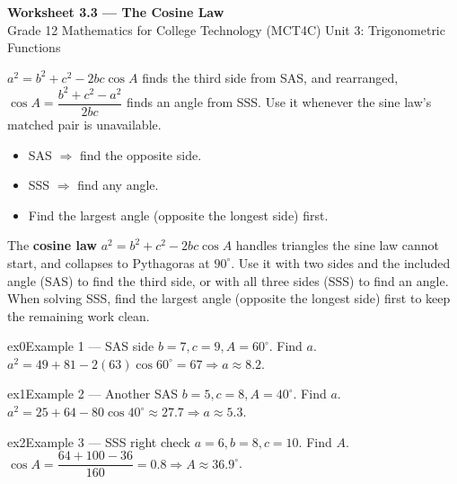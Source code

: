 \documentclass[11pt]{article}
\begin{document}
\begin{center}
{\LARGE\bfseries\color{titleblue}Worksheet 3.3 --- The Cosine Law}\\[2pt]
{\small Grade 12 Mathematics for College Technology (MCT4C) \textperiodcentered{} Unit 3: Trigonometric Functions}
\end{center}

\begin{ideabox}
$a^2=b^2+c^2-2bc\cos A$ finds the third side from SAS, and rearranged, $\cos A=\dfrac{b^2+c^2-a^2}{2bc}$ finds an angle from SSS. Use it whenever the sine law's matched pair is unavailable.
\begin{itemize}[leftmargin=*,itemsep=2pt]
  \item SAS $\Rightarrow$ find the opposite side.
  \item SSS $\Rightarrow$ find any angle.
  \item Find the largest angle (opposite the longest side) first.
\end{itemize}
\end{ideabox}

\begin{learnbox}
The \textbf{cosine law} $a^2=b^2+c^2-2bc\cos A$ handles triangles the sine law cannot start, and collapses to Pythagoras at $90^\circ$.
Use it with two sides and the included angle (SAS) to find the third side, or with all three sides (SSS) to find an angle.
When solving SSS, find the largest angle (opposite the longest side) first to keep the remaining work clean.
\end{learnbox}


\begin{example}{ex0}{Example 1 --- SAS side}
$b=7,c=9,A=60^\circ$. Find $a$.\soln $a^2=49+81-2(63)\cos60^\circ=67\Rightarrow a\approx8.2$.
\end{example}

\begin{example}{ex1}{Example 2 --- Another SAS}
$b=5,c=8,A=40^\circ$. Find $a$.\soln $a^2=25+64-80\cos40^\circ\approx27.7\Rightarrow a\approx5.3$.
\end{example}

\begin{example}{ex2}{Example 3 --- SSS right check}
$a=6,b=8,c=10$. Find $A$.\soln $\cos A=\dfrac{64+100-36}{160}=0.8\Rightarrow A\approx36.9^\circ$.
\end{example}
\end{document}
